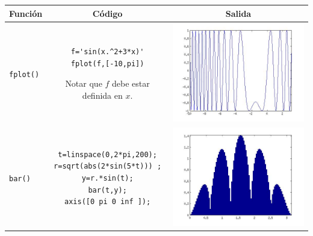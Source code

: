 \documentclass[letter,11pt]{article}
\newcommand\0{\mathbf{0}}
\begin{document}
 \begin{center}
  \begin{longtable}{||l|c|c||}
   Funci\'on 		& C\'odigo 		& Salida \\
   \hline

\texttt{fplot()}		
  &
\begin{minipage}{3in}
\begin{verbatim}
f='sin(x.^2+3*x)'
fplot(f,[-10,pi])
\end{verbatim}

Notar que $f$ debe estar definida en $x$.
\end{minipage}
&
\begin{minipage}{0.3\textwidth}
\includegraphics[width=\textwidth]{./ej1.jpg}
\end{minipage}
\\
\hline
\texttt{bar()}		
  & 
\begin{minipage}{3in}
\begin{verbatim}
t=linspace(0,2*pi,200);
r=sqrt(abs(2*sin(5*t))) ;
y=r.*sin(t);
bar(t,y);
axis([0 pi 0 inf ]);
\end{verbatim}
\end{minipage}
&
\begin{minipage}{0.3\textwidth}
\includegraphics[width=\textwidth]{./ej2.jpg}

\end{minipage}
\end{longtable}
\end{center}
\end{document}
